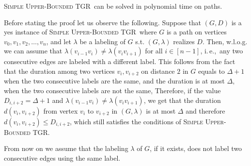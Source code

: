 \documentclass[a4paper,UKenglish,cleveref, autoref, thm-restate]{lipics-v2021}
\newcommand{\ie}{i.\,e.,\ }
\newcommand{\deltaUpperBound}{\textsc{Simple Upper-Bounded TGR}}
\begin{document}
\begin{comment}
Suppose that $(G, D)$ is a yes instance and let $\lambda$ be a labeling of $G$ s.t. $(G,\lambda)$ realizes $D$.
W.l.o.g. we can assume that $\lambda(v_{i-1} v_{i}) \neq \lambda (v_{i}v_{i+1})$ for all $i \in [n-1]$.
This follows from the fact that the duration among two vertices $v_i, v_{i+2}$ on distance $2$ in $P$ equals to $\Delta + 1$ when the two consecutive labels are the same, but if the labels are not the same, the duration can be at most $\Delta$.
Therefore if $D_{i,i+2}= \Delta + 1$ and $\lambda(v_{i-1} v_{i}) \neq \lambda (v_{i}v_{i+1})$ we get that $d(i, i+2) \leq \Delta \leq D_{i,i+2}$ which still satisfies the conditions.

From now on we assume that $D$ is a reduced matrix, that satisfies the above conditions, and that the labeling $\lambda$ of $G$, if it exists, does not label two consecutive edges using the same label.
\end{comment}

\begin{theorem}\label{thm:paths-upperBound}
	\deltaUpperBound\ can be solved in polynomial time on paths.
\end{theorem}

Before stating the proof let us observe the following.
Suppose that $(G, D)$ is a yes instance of \deltaUpperBound\, where $G$ is a path on vertices $v_0, v_1, v_2, \dots, v_n$, 
and let $\lambda$ be a labeling of $G$ s.t. $(G,\lambda)$ realizes $D$.
Then, w.l.o.g. we can assume that $\lambda(v_{i-1} v_{i}) \neq \lambda (v_{i}v_{i+1})$ for all $i \in [n-1]$, \ie any two consecutive edges are labeled with a different label.
This follows from the fact that the duration among two vertices $v_i, v_{i+2}$ on distance $2$ in $G$ equals to $\Delta + 1$ when the two consecutive labels are the same, 
and the duration is at most $\Delta$,
when the two consecutive labels are not the same,
Therefore, if the value $D_{i,i+2}= \Delta + 1$ and $\lambda(v_{i-1} v_{i}) \neq \lambda (v_{i}v_{i+1})$, we get that the duration $d(v_i, v_{i+2})$ from vertex $v_i$ to $v_{i+2}$ in $(G, \lambda)$ is at most $\Delta$ 
and therefore $d(v_i, v_{i+2}) \leq D_{i,i+2}$,
which still satisfies the conditions of \deltaUpperBound.

From now on we assume that the labeling $\lambda$ of $G$, if it exists, does not label two consecutive edges using the same label.
\end{document}
